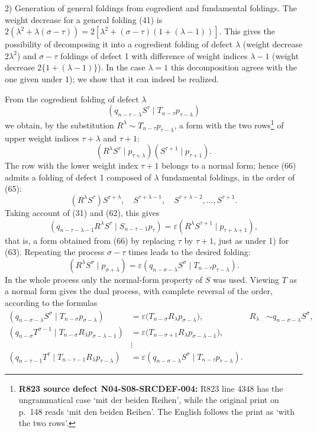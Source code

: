 \documentclass[10pt]{article}
\newcommand{\pair}[2]{(#1\mid #2)}
\newcommand{\eps}{\varepsilon}
\begin{document}
2) Generation of general foldings from cogredient and fundamental foldings.
The weight decrease for a general folding (41) is
$2(\lambda^2+\lambda(\sigma-\tau))
=2[\lambda^2+(\sigma-\tau)(1+(\lambda-1))]$. This gives the possibility of
decomposing it into a cogredient folding of defect $\lambda$ (weight
decrease $2\lambda^2$) and $\sigma-\tau$ foldings of defect 1 with
difference of weight indices $\lambda-1$ (weight decrease
$2\{1+(\lambda-1)\}$). In the case $\lambda=1$ this decomposition agrees
with the one given under 1); we show that it can indeed be realized.

From the cogredient folding of defect $\lambda$
\[
 \pair{q_{n-\tau-\lambda}S^\tau}{T_{n-\tau}p_{\tau-\lambda}}
\]
we obtain, by the substitution
$R^\lambda\sim T_{n-\tau}p_{\tau-\lambda}$, a form with the two
rows\footnote{\textbf{R823 source defect N04-S08-SRCDEF-004:} R823 line
4348 has the ungrammatical case `mit der beiden Reihen', while the original
print on p.~148 reads `mit den beiden Reihen'. The English follows the print
as `with the two rows'.} of
upper weight indices $\tau+\lambda$ and $\tau+1$:
\begin{equation}
 \pair{R^\lambda S^\tau}{p_{\tau+\lambda}}
 \pair{S^{\tau+1}}{p_{\tau+1}}.
\tag{66}
\end{equation}
The row with the lower weight index $\tau+1$ belongs to a normal form; hence
(66) admits a folding of defect 1 composed of $\lambda$ fundamental
foldings, in the order of (65):
\[
 (R^\lambda S^\tau)S^{\tau+\lambda},\quad
 S^{\tau+\lambda-1},\quad S^{\tau+\lambda-2},\ldots,S^{\tau+1}.
\]
Taking account of (31) and (62), this gives
\[
 \pair{q_{n-\tau-\lambda-1}R^\lambda S^\tau}{S_{n-\tau-1}p_\tau}
 =\eps\pair{R^\lambda S^{\tau+1}}{p_{\tau+\lambda+1}},
\]
that is, a form obtained from (66) by replacing $\tau$ by $\tau+1$, just as
under 1) for (63). Repeating the process $\sigma-\tau$ times leads to the
desired folding:
\[
 \pair{R^\lambda S^\sigma}{p_{\sigma+\lambda}}
 =\eps\pair{q_{n-\sigma-\lambda}S^\sigma}
 {T_{n-\tau}p_{\tau-\lambda}}.
\]
In the whole process only the normal-form property of $S$ was used. Viewing
$T$ as a normal form gives the dual process, with complete reversal of the
order, according to the formulas
\begin{align*}
\pair{q_{n-\sigma-\lambda}S^\sigma}{T_{n-\sigma}p_{\sigma-\lambda}}
 &=\eps\bigl(T_{n-\sigma}R_\lambda p_{\sigma-\lambda}\bigr),
 &R_\lambda&\sim q_{n-\sigma-\lambda}S^\sigma,\\
\pair{q_{n-\sigma}T^{\sigma-1}}
{T_{n-\sigma}R_\lambda p_{\sigma-\lambda-1}}
 &=\eps\bigl(T_{n-\sigma+1}R_\lambda p_{\sigma-\lambda-1}\bigr),\\
&\vdots\\
\pair{q_{n-\tau-1}T^\tau}
{T_{n-\tau-1}R_\lambda p_{\tau-\lambda}}
 &=\eps\pair{q_{n-\sigma-\lambda}S^\sigma}
 {T_{n-\tau}p_{\tau-\lambda}}.
\end{align*}
\end{document}
